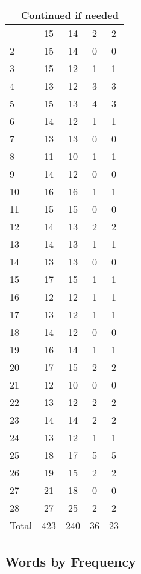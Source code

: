 \begin{center}
\begin{longtable}{l|c|c|c|c}
\hline \multicolumn{5}{|r|}{{Continued if needed}} \\ \hline
\endfoot 
1 & 15 & 14 & 2 & 2\\ \hline
2 & 15 & 14 & 0 & 0\\ \hline
3 & 15 & 12 & 1 & 1\\ \hline
4 & 13 & 12 & 3 & 3\\ \hline
5 & 15 & 13 & 4 & 3\\ \hline
6 & 14 & 12 & 1 & 1\\ \hline
7 & 13 & 13 & 0 & 0\\ \hline
8 & 11 & 10 & 1 & 1\\ \hline
9 & 14 & 12 & 0 & 0\\ \hline
10 & 16 & 16 & 1 & 1\\ \hline
11 & 15 & 15 & 0 & 0\\ \hline
12 & 14 & 13 & 2 & 2\\ \hline
13 & 14 & 13 & 1 & 1\\ \hline
14 & 13 & 13 & 0 & 0\\ \hline
15 & 17 & 15 & 1 & 1\\ \hline
16 & 12 & 12 & 1 & 1\\ \hline
17 & 13 & 12 & 1 & 1\\ \hline
18 & 14 & 12 & 0 & 0\\ \hline
19 & 16 & 14 & 1 & 1\\ \hline
20 & 17 & 15 & 2 & 2\\ \hline
21 & 12 & 10 & 0 & 0\\ \hline
22 & 13 & 12 & 2 & 2\\ \hline
23 & 14 & 14 & 2 & 2\\ \hline
24 & 13 & 12 & 1 & 1\\ \hline
25 & 18 & 17 & 5 & 5\\ \hline
26 & 19 & 15 & 2 & 2\\ \hline
27 & 21 & 18 & 0 & 0\\ \hline
28 & 27 & 25 & 2 & 2\\ \hline
\hline \hline
Total & 423 & 240 & 36 & 23



\end{longtable}
\end{center}

 
\subsection{Words by Frequency}

